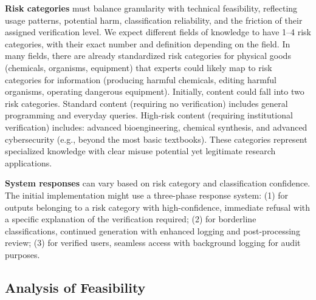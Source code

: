 \documentclass{article}
\theoremstyle{plain}
\theoremstyle{definition}
\theoremstyle{remark}
\begin{document}
\textbf{Risk categories} must balance granularity with technical feasibility, reflecting usage patterns, potential harm, classification reliability, and the friction of their assigned verification level.
We expect different fields of knowledge to have 1--4 risk categories, with their exact number and definition depending on the field.
In many fields, there are already standardized risk categories for physical goods (chemicals, organisms, equipment) that experts could likely map to risk categories for information (producing harmful chemicals, editing harmful organisms, operating dangerous equipment).
Initially, content could fall into two risk categories.
Standard content (requiring no verification) includes general programming and everyday queries.
High-risk content (requiring institutional verification) includes: advanced bioengineering, chemical synthesis, and advanced cybersecurity (e.g., beyond the most basic textbooks).
These categories represent specialized knowledge with clear misuse potential yet legitimate research applications.

\textbf{System responses} can vary based on risk category and classification confidence.
The initial implementation might use a three-phase response system:
(1) for outputs belonging to a risk category with high-confidence, immediate refusal with a specific explanation of the verification required;
(2) for borderline classifications, continued generation with enhanced logging and post-processing review;
(3) for verified users, seamless access with background logging for audit purposes.

\subsection{Analysis of Feasibility}
\label{section:feasibility-analysis}

\end{document}
